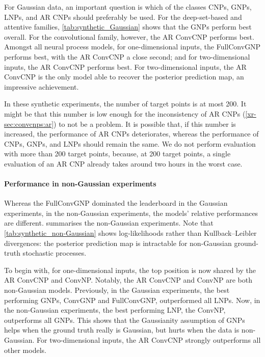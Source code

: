 \documentclass[12pt, twoside]{report}
\newcommand{\xrprefix}[1]{xr-#1}
\begin{document}
For Gaussian data,
an important question is which of the classes CNPs, GNPs, LNPs, and AR CNPs should preferably be used.
For the deep-set-based and attentive families, \cref{tab:synthetic_Gaussian} shows that the GNPs perform best overall.
For the convolutional family, however, the AR ConvCNP performs best.
Amongst all neural process models, for one-dimensional inputs, the FullConvGNP performs best, with the AR ConvCNP a close second;
and for two-dimensional inputs, the AR ConvCNP performs best.
For two-dimensional inputs, the AR ConvCNP is the only model able to recover the posterior prediction map, an impressive achievement.

In these synthetic experiments, the number of target points is at most 200.
It might be that this number is low enough for the inconsistency of AR CNPs (\cref{\xrprefix{sec:convcnps:ar}}) to not be a problem.
It is possible that, if this number is increased, the performance of AR CNPs deteriorates, whereas the performance of CNPs, GNPs, and LNPs should remain the same.
We do not perform evaluation with more than 200 target points, because, at 200 target points, a single evaluation of an AR CNP already takes around two hours in the worst case.

\paragraph{Performance in non-Gaussian experiments}
Whereas the FullConvGNP dominated the leaderboard in the Gaussian experiments, in the non-Gaussian experiments, 
the models' relative performances are different.
 summarises the non-Gaussian experiments.
Note that \cref{tab:synthetic_non-Gaussian} shows log-likelihoods rather than Kullback--Leibler divergences:
the posterior prediction map is intractable for non-Gaussian ground-truth stochastic processes.

To begin with, for one-dimensional inputs, the top position is now shared by the AR ConvCNP and ConvNP.
Notably, the AR ConvCNP and ConvNP are both non-Gaussian models.
Previously, in the Gaussian experiments, the best performing GNPs, ConvGNP and FullConvGNP, outperformed all LNPs.
Now, in the non-Gaussian experiments, the best performing LNP, the ConvNP, outperforms all GNPs.
This shows that the Gaussianity assumption of GNPs helps when the ground truth really is Gaussian,
but hurts when the data is non-Gaussian.
For two-dimensional inputs, the AR ConvCNP strongly outperforms all other models.
\end{document}
